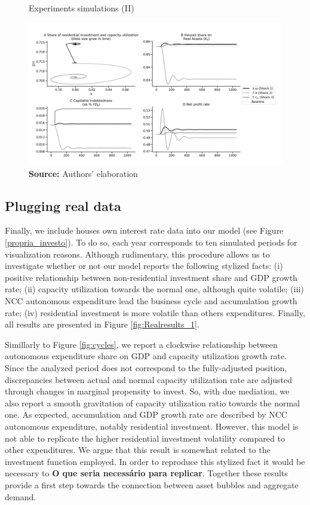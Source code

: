 \documentclass[11pt]{article}
\begin{document}
\begin{figure}[htb]
	\centering
	\caption{Experiments simulations (II)}
	\label{fig:results_2}
	\includegraphics[width=.8\textwidth]{./figs/Compared_Shocks_2.png}
	\caption*{\textbf{Source:} Authors' elaboration}
\end{figure}


\subsection{Plugging real data}
\label{sec:orgb2cd5b1}
\label{real_sim}

Finally, we include houses own interest rate data into our model (see Figure \ref{propria_investo}).
To do so, each year corresponds to ten simulated periods for visualization reasons.
Although rudimentary, this procedure allows us to investigate whether or not our model reports the following stylized facts:
(i) positive relationship between non-residential investment share and GDP growth rate; (ii) capacity utilization towards the normal one, although quite volatile; (iii) NCC autonomous expenditure lead the business cycle and accumulation growth rate; (iv) residential investment is more volatile than others expenditures.
Finally, all results are presented in Figure \ref{fig:Realresults_1}.

Simillarly to Figure \ref{fig:cycles}, we report a clockwise relationship between autonomous expenditure share on GDP and capacity utilization growth rate.
Since the analyzed period does not correspond to the fully-adjusted position, discrepancies between actual and normal capacity utilization rate are adjusted through changes in marginal propensity to invest.
So, with due mediation, we also report a smooth gravitation of capacity utilization ratio towards the normal one.
As expected, accumulation and GDP growth rate are described by NCC autonomous expenditure, notably residential investment. 
However, this model is not able to replicate the higher residential investment volatility compared to other expenditures.
We argue that this result is somewhat related to the investment function employed. In order to reproduce this stylized fact it would be necessary to \textbf{O que seria necessário para replicar}.
Together these results provide a first step towards the connection between asset bubbles and aggregate demand.
\end{document}
